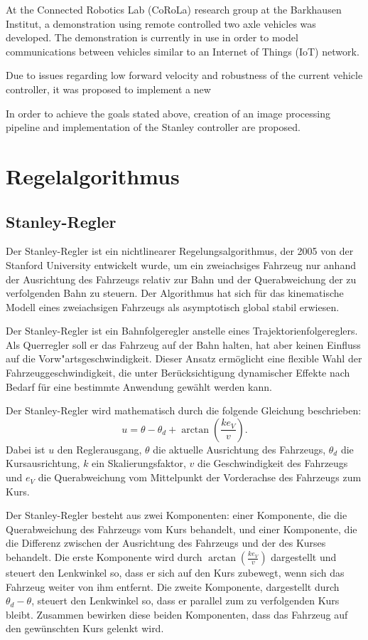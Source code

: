 \documentclass[arbeit=studie,oneside,BCOR=12mm]{ArbeitRST}
\begin{document}
At the Connected Robotics Lab (CoRoLa) research group at the Barkhausen
Institut, a demonstration using remote controlled two axle vehicles was
developed. The demonstration is currently in use in order to model
communications between vehicles similar to an Internet of Things (IoT) network.

Due to issues regarding low forward velocity and robustness of the current
vehicle controller, it was proposed to implement a new 

In order to achieve the goals stated above, creation of an image processing
pipeline and implementation of the Stanley controller are proposed.

\chapter{Regelalgorithmus}

\section{Stanley-Regler}

Der Stanley-Regler ist ein nichtlinearer Regelungsalgorithmus, der 2005 von
der Stanford University entwickelt wurde, um ein zweiachsiges Fahrzeug nur
anhand der Ausrichtung des Fahrzeugs relativ zur Bahn und der Querabweichung der zu verfolgenden Bahn zu
steuern. Der Algorithmus hat sich für das kinematische Modell eines
zweiachsigen Fahrzeugs als asymptotisch global stabil erwiesen.

Der Stanley-Regler ist ein Bahnfolgeregler anstelle eines
Trajektorienfolgereglers. Als Querregler soll er das Fahrzeug auf der Bahn
halten, hat aber keinen Einfluss auf die Vorw"artsgeschwindigkeit. Dieser
Ansatz ermöglicht eine flexible Wahl der Fahrzeuggeschwindigkeit, die unter
Berücksichtigung dynamischer Effekte nach Bedarf für eine bestimmte Anwendung
gewählt werden kann. 

Der Stanley-Regler wird mathematisch durch die folgende Gleichung beschrieben:
\begin{equation} 
  u = \theta - \theta_d + \arctan\left(\frac{ke_{V}}{v}\right).
  \label{eq:Stanley-Regler} 
\end{equation}
Dabei ist $u$ den Reglerausgang, $\theta$ die aktuelle Ausrichtung des Fahrzeugs,
$\theta_d$ die Kursausrichtung, $k$ ein Skalierungsfaktor, $v$ die
Geschwindigkeit des Fahrzeugs und $e_{V}$ die Querabweichung vom Mittelpunkt
der Vorderachse des Fahrzeugs zum Kurs.

Der Stanley-Regler besteht aus zwei Komponenten: einer Komponente, die die
Querabweichung des Fahrzeugs vom Kurs behandelt, und einer Komponente, die die
Differenz zwischen der Ausrichtung des Fahrzeugs und der des Kurses behandelt.
Die erste Komponente wird durch $\arctan(\frac{ke_{V}}{v})$ dargestellt und
steuert den Lenkwinkel so, dass er sich auf den Kurs zubewegt, wenn sich das
Fahrzeug weiter von ihm entfernt. Die zweite Komponente, dargestellt durch
$\theta_d - \theta$, steuert den Lenkwinkel so, dass er parallel zum zu
verfolgenden Kurs bleibt. Zusammen bewirken diese beiden Komponenten, dass
das Fahrzeug auf den gewünschten Kurs gelenkt wird.
\end{document}
